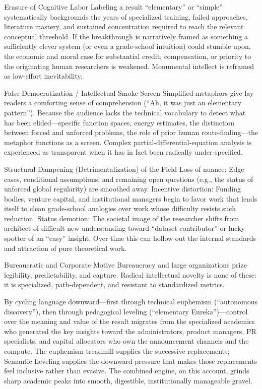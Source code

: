 Erasure of Cognitive Labor  
   Labeling a result “elementary” or “simple” systematically backgrounds the years of specialized training, failed approaches, literature mastery, and sustained concentration required to reach the relevant conceptual threshold. If the breakthrough is narratively framed as something a sufficiently clever system (or even a grade-school intuition) could stumble upon, the economic and moral case for substantial credit, compensation, or priority to the originating human researchers is weakened. Monumental intellect is reframed as low-effort inevitability.

False Democratization / Intellectual Smoke Screen  
   Simplified metaphors give lay readers a comforting sense of comprehension (“Ah, it was just an elementary pattern”). Because the audience lacks the technical vocabulary to detect what has been elided—specific function spaces, energy estimates, the distinction between forced and unforced problems, the role of prior human route-finding—the metaphor functions as a screen. Complex partial-differential-equation analysis is experienced as transparent when it has in fact been radically under-specified.

Structural Dampening (Detrimentalization) of the Field  
   Loss of nuance: Edge cases, conditional assumptions, and remaining open questions (e.g., the status of unforced global regularity) are smoothed away.  
   Incentive distortion: Funding bodies, venture capital, and institutional managers begin to favor work that lends itself to clean grade-school analogies over work whose difficulty resists such reduction.  
   Status demotion: The societal image of the researcher shifts from architect of difficult new understanding toward “dataset contributor” or lucky spotter of an “easy” insight. Over time this can hollow out the internal standards and attraction of pure theoretical work.

Bureaucratic and Corporate Motive
Bureaucracy and large organizations prize legibility, predictability, and capture. Radical intellectual novelty is none of these: it is specialized, path-dependent, and resistant to standardized metrics.  

By cycling language downward—first through technical euphemism (“autonomous discovery”), then through pedagogical leveling (“elementary Eureka”)—control over the meaning and value of the result migrates from the specialized academics who generated the key insights toward the administrators, product managers, PR specialists, and capital allocators who own the announcement channels and the compute. The euphemism treadmill supplies the successive replacements; Semantic Leveling supplies the downward pressure that makes those replacements feel inclusive rather than evasive. The combined engine, on this account, grinds sharp academic peaks into smooth, digestible, institutionally manageable gravel.

